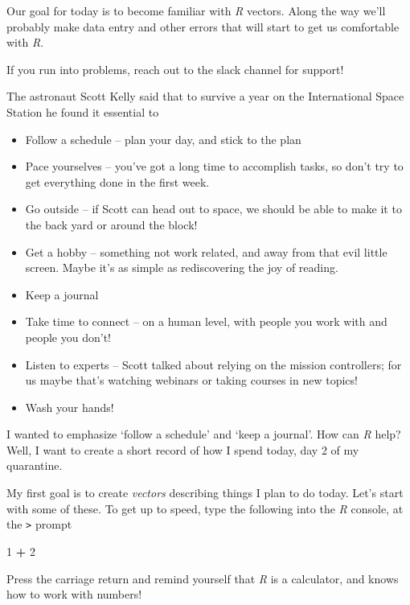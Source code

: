 \documentclass[]{book}
\newenvironment{Shaded}{\begin{snugshade}}{\end{snugshade}}
\newcommand{\DecValTok}[1]{\textcolor[rgb]{0.00,0.00,0.81}{#1}}
\newcommand{\OperatorTok}[1]{\textcolor[rgb]{0.81,0.36,0.00}{\textbf{#1}}}
\newcommand{\StringTok}[1]{\textcolor[rgb]{0.31,0.60,0.02}{#1}}
\providecommand{\tightlist}{%
  \setlength{\itemsep}{0pt}\setlength{\parskip}{0pt}}
\begin{document}
Our goal for today is to become familiar with \emph{R} vectors. Along the way we'll probably make data entry and other errors that will start to get us comfortable with \emph{R}.

If you run into problems, reach out to the slack channel for support!

The astronaut Scott Kelly said that to survive a year on the International Space Station he found it essential to

\begin{itemize}
\tightlist
\item
  Follow a schedule -- plan your day, and stick to the plan
\item
  Pace yourselves -- you've got a long time to accomplish tasks, so don't try to get everything done in the first week.
\item
  Go outside -- if Scott can head out to space, we should be able to make it to the back yard or around the block!
\item
  Get a hobby -- something not work related, and away from that evil little screen. Maybe it's as simple as rediscovering the joy of reading.
\item
  Keep a journal
\item
  Take time to connect -- on a human level, with people you work with and people you don't!
\item
  Listen to experts -- Scott talked about relying on the mission controllers; for us maybe that's watching webinars or taking courses in new topics!
\item
  Wash your hands!
\end{itemize}

I wanted to emphasize `follow a schedule' and `keep a journal'. How can \emph{R} help? Well, I want to create a short record of how I spend today, day 2 of my quarantine.

My first goal is to create \emph{vectors} describing things I plan to do today. Let's start with some of these. To get up to speed, type the following into the \emph{R} console, at the \texttt{\textgreater{}} prompt

\begin{Shaded}
\begin{Highlighting}[]
\DecValTok{1} \OperatorTok{+}\StringTok{ }\DecValTok{2}
\end{Highlighting}
\end{Shaded}

Press the carriage return and remind yourself that \emph{R} is a calculator, and knows how to work with numbers!
\end{document}

